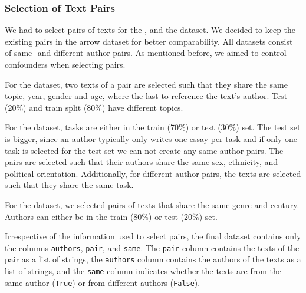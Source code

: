 \subsubsection{Selection of Text Pairs}
\label{subsubsec:dataset_text_pair_selection}

We had to select pairs of texts for the \dataBlog{}, \dataStudent{} and the \dataGutenberg{} dataset.
We decided to keep the existing pairs in the \dataPan{} arrow dataset for better comparability.
All datasets consist of same- and different-author pairs. 
As mentioned before, we aimed to control confounders when selecting pairs.

For the \dataBlog{} dataset, 
two texts of a pair are selected such that they share the same topic, year, gender and age, where the last to reference the text's author.
Test (20\%) and train split (80\%) have different topics.

For the \dataStudent{} dataset,
tasks are either in the train (70\%) or test (30\%) set.
The test set is bigger, since an author typically only writes one essay per task and if only one task is selected for the test set we can not create any same author pairs.
The pairs are selected such that their authors share the same sex, ethnicity, and political orientation.
Additionally, for different author pairs, the texts are selected such that they share the same task.

For the \dataGutenberg{} dataset,
we selected pairs of texts that share the same genre and century.
Authors can either be in the train (80\%) or test (20\%) set.

Irrespective of the information used to select pairs, the final dataset contains only the columns \texttt{authors}, \texttt{pair}, and \texttt{same}.
The \texttt{pair} column contains the texts of the pair as a list of strings,
the \texttt{authors} column contains the authors of the texts as a list of strings,
and the \texttt{same} column indicates whether the texts are from the same author (\texttt{True}) or from different authors (\texttt{False}).
